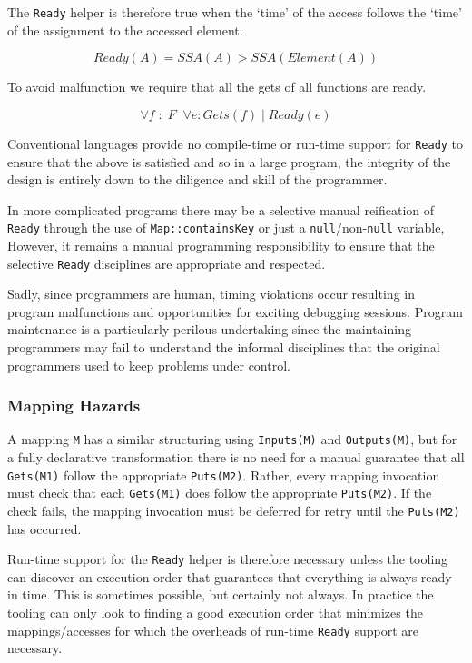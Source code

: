 \documentclass{jot}
\begin{document}
The \verb|Ready| helper is therefore true when the `time' of the access follows the `time' of the assignment to the accessed element.

\begin{equation}
		Ready(A) = SSA(A) > SSA(Element(A))
\end{equation}

To avoid malfunction we require that all the gets of all functions are ready.

\begin{equation}
	\forall f \; : \; F \; \; \forall e : Gets(f) \; | \; Ready(e)
\end{equation}

Conventional languages provide no compile-time or run-time support for \verb|Ready| to ensure that the above is satisfied and so in a large program, the integrity of the design is entirely down to the diligence and skill of the programmer.

In more complicated programs there may be a selective manual reification of \verb|Ready| through the use of \verb|Map::containsKey| or just a \verb|null|/non-\verb|null| variable, However, it remains a manual programming responsibility to ensure that the selective \verb|Ready| disciplines are appropriate and respected.

Sadly, since programmers are human, timing violations occur resulting in program malfunctions and opportunities for exciting debugging sessions. Program maintenance is a particularly perilous undertaking since the maintaining programmers may fail to understand the informal disciplines that the original programmers used to keep problems under control.

\subsubsection{Mapping Hazards}

A mapping \verb|M| has a similar structuring using \verb|Inputs(M)| and \verb|Outputs(M)|, but for a fully declarative transformation there is no need for a manual guarantee that all \verb|Gets(M1)| follow the appropriate \verb|Puts(M2)|. Rather, every mapping invocation must check that each \verb|Gets(M1)| does follow the appropriate \verb|Puts(M2)|. If the check fails, the mapping invocation must be deferred for retry until the \verb|Puts(M2)| has occurred.

Run-time support for the \verb|Ready| helper is therefore necessary unless the tooling can discover an execution order that guarantees that everything is always ready in time. This is sometimes possible, but certainly not always. In practice the tooling can only look to finding a good execution order that minimizes the mappings/accesses for which the overheads of run-time \verb|Ready| support are necessary.
\end{document}
